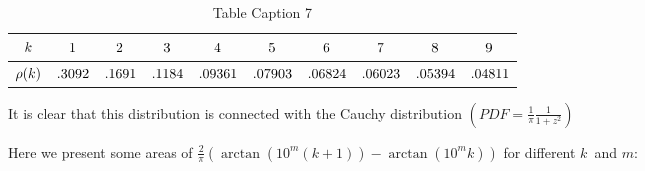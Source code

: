 \documentclass[titlepage,fleqn]{article}%
\begin{document}
\begin{table}[!htbp] \centering
\begin{tabular}
[c]{|c|c|c|c|c|c|c|c|c|c|}\hline\hline
${\small k}$ & ${\small 1}$ & ${\small 2}$ & ${\small 3}$ & ${\small 4}$ &
${\small 5}$ & ${\small 6}$ & ${\small 7}$ & ${\small 8}$ & ${\small 9}%
$\\\hline
${\small \rho(k)}$ & ${\small .3092}$ & ${\small .1691}$ & ${\small .1184}$ &
${\small .09361}$ & ${\small .07903}$ & ${\small .06824}$ & ${\small .06023}$
& ${\small .05394}$ & ${\small .04811}$\\\hline\hline
\end{tabular}
\caption{Table Caption 7}\label{TableKey7}%
\end{table}%


\bigskip It is clear that this distribution is connected with the Cauchy
distribution $\left(  PDF=\frac{1}{\pi}\frac{1}{1+z^{2}}\right)  $

Here we present some areas of $\frac{2}{\pi}\left(  \arctan(10^{m}%
(k+1))-\arctan(10^{m}k)\right)  $ for different $k$\ and $m$:\ %
\end{document}
